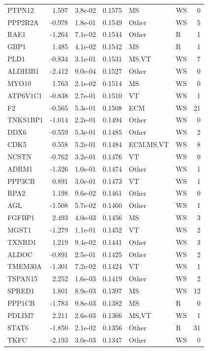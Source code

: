 \begin{table}[ht]
\begin{tabular}{lrlrllr}
  PTPN12 & 1.597 & 3.8e-02 & 0.1575 & MS & WS & 0 \\ 
  PPP2R2A & -0.978 & 1.8e-01 & 0.1549 & Other & WS & 5 \\ 
  RAE1 & -1.264 & 7.1e-02 & 0.1544 & Other & R & 1 \\ 
  GBP1 & 1.485 & 4.1e-02 & 0.1542 & MS & R & 1 \\ 
  PLD1 & -0.834 & 3.1e-01 & 0.1531 & MS,VT & WS & 7 \\ 
  ALDH3B1 & -2.412 & 9.0e-04 & 0.1527 & Other & WS & 0 \\ 
  MYO10 & 1.763 & 2.1e-02 & 0.1514 & MS & WS & 0 \\ 
  ATP6V1C1 & -0.838 & 2.7e-01 & 0.1510 & VT & WS & 1 \\ 
  F2 & -0.565 & 5.3e-01 & 0.1508 & ECM & WS & 21 \\ 
  TNKS1BP1 & -1.014 & 2.2e-01 & 0.1494 & Other & WS & 0 \\ 
  DDX6 & -0.559 & 5.3e-01 & 0.1485 & Other & WS & 2 \\ 
  CDK5 & 0.558 & 5.2e-01 & 0.1484 & ECM,MS,VT & WS & 8 \\ 
  NCSTN & -0.762 & 3.2e-01 & 0.1476 & VT & WS & 0 \\ 
  ADRM1 & -1.326 & 1.0e-01 & 0.1474 & Other & WS & 1 \\ 
  PPP3CB & 0.891 & 3.0e-01 & 0.1473 & VT & WS & 1 \\ 
  RPA2 & 1.198 & 9.6e-02 & 0.1461 & Other & WS & 0 \\ 
  AGL & -1.508 & 5.7e-02 & 0.1460 & Other & WS & 1 \\ 
  FGFBP1 & 2.493 & 4.0e-03 & 0.1456 & MS & WS & 3 \\ 
  MGST1 & -1.279 & 1.1e-01 & 0.1452 & VT & WS & 2 \\ 
  TXNRD1 & 1.219 & 9.4e-02 & 0.1441 & Other & WS & 3 \\ 
  ALDOC & -0.891 & 2.5e-01 & 0.1425 & Other & WS & 2 \\ 
  TMEM30A & -1.301 & 7.2e-02 & 0.1424 & VT & WS & 1 \\ 
  TSPAN15 & 2.252 & 1.6e-03 & 0.1419 & Other & WS & 2 \\ 
  SPRED1 & 1.801 & 8.9e-03 & 0.1397 & MS & WS & 12 \\ 
  PPP1CB & -1.783 & 9.8e-03 & 0.1382 & MS & R & 0 \\ 
  PDLIM7 & 2.211 & 2.6e-03 & 0.1366 & MS,VT & WS & 1 \\ 
  STAT6 & -1.850 & 2.1e-02 & 0.1356 & Other & R & 31 \\ 
  TKFC & -2.193 & 3.0e-03 & 0.1347 & Other & WS & 0 \\ 

\end{tabular}
\end{table}
